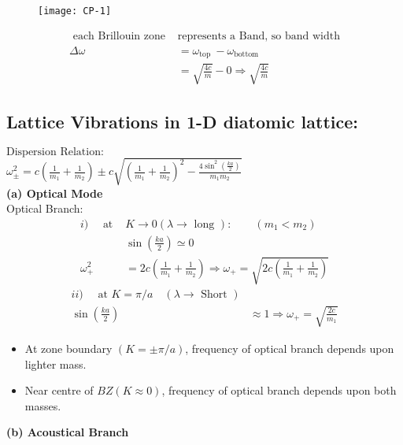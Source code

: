 \begin{figure}[H]
	\centering
	\texttt{[image: CP-1]}
\end{figure}
\begin{align*}
\text { each Brillouin zone  }&\text{represents a Band, so band width}\\
\Delta \omega &=\omega_{\text {top }}-\omega_{\text {bottom }} \\
&=\sqrt{\frac{4 c}{m}}-0 \Rightarrow \sqrt{\frac{4 c}{m}}
\end{align*}
\subsection{Lattice Vibrations in 1-D diatomic lattice:}
$\text{Dispersion Relation}:$\\
$\omega_{\pm}^{2}=c\left(\frac{1}{m_{1}}+\frac{1}{m_{2}}\right) \pm c \sqrt{\left(\frac{1}{m_{1}}+\frac{1}{m_{2}}\right)^{2}-\frac{4 \sin ^{2}\left(\frac{k a}{2}\right)}{m_{1} m_{2}}}$\\
\textbf{(a) Optical Mode}\\
Optical Branch:
\begin{align*}
i)\quad \text { at }& K \rightarrow 0(\lambda \rightarrow \text { long }):\qquad\left(m_{1}<m_{2}\right)\\
&\sin \left(\frac{k a}{2}\right) \simeq 0\\
\omega_{+}^{2}&=2 c\left(\frac{1}{m_{1}}+\frac{1}{m_{2}}\right) \Rightarrow \omega_{+}=\sqrt{2 c\left(\frac{1}{m_{1}}+\frac{1}{m_{2}}\right)}
\end{align*}
\begin{align*}
ii)\quad \text { at } K=\pi/a \quad(\lambda \rightarrow \text { Short })\\
\sin \left(\frac{k a}{2}\right) &\approx 1 \Rightarrow \omega_{+}=\sqrt{\frac{2 c}{m_{1}}}
\end{align*}
\begin{itemize}
	\item At zone boundary $(K=\pm \pi/a)$, frequency of optical branch depends upon lighter mass.\item
Near centre of $BZ(K\approx 0)$, frequency of optical branch depends upon both masses.
\end{itemize}
\textbf{(b) Acoustical Branch}
